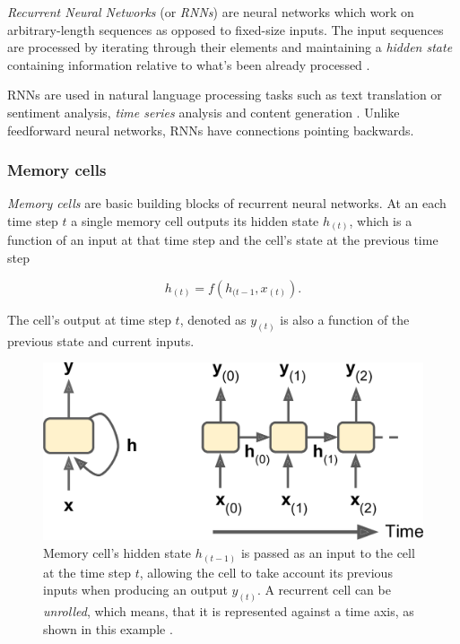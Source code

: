 \emph{Recurrent Neural Networks} (or \emph{RNNs}) are neural networks which work on arbitrary-length sequences as opposed to fixed-size inputs. The input sequences are processed by iterating through their elements and maintaining a \emph{hidden state} containing information relative to what's been already processed \cite{chollet}.

RNNs are used in natural language processing tasks such as text translation or sentiment analysis, \emph{time series} analysis and content generation \cite{rnn_generation}. Unlike feedforward neural networks, RNNs have connections pointing backwards.

\subsubsection{Memory cells}

\emph{Memory cells} are basic building blocks of recurrent neural networks. At an each time step $t$ a single memory cell outputs its hidden state $h_{(t)}$, which is a function of an input at that time step and the cell's state at the previous time step

\begin{equation}
h_{(t)} = f(h_{(t-1}, x_{(t)}).
\end{equation}

The cell's output at time step $t$, denoted as $y_{(t)}$ is also a function of the previous state and current inputs.

\begin{figure}[]
\centering
\includegraphics[scale=0.6]{figures/memory_cells.png}
\caption{Memory cell's hidden state $h_{(t-1)}$ is passed as an input to the cell at the time step $t$, allowing the cell to take account its previous inputs when producing an output $y_{(t)}$. A recurrent cell can be \emph{unrolled}, which means, that it is represented against a time axis, as shown in this example \cite{handson_geron}. }
\end{figure}

